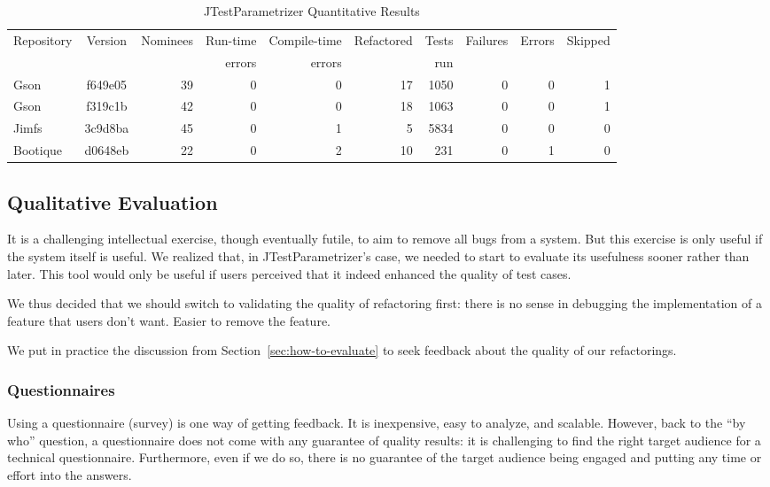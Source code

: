 \begin{table*}[h!]
\centering
\begin{tabular}{l c r r r r r r r r} 
 Repository & Version & Nominees & Run-time  & Compile-time  & Refactored & Tests & Failures & Errors & Skipped \\
  &  &  & errors & errors &  & run &  &  &  \\ [0.75ex]
 \hline\hline
 Gson & f649e05 & 39 & 0 & 0 & 17 & 1050 & 0 & 0 & 1 \\ 
 Gson & f319c1b & 42 & 0 & 0 & 18 & 1063 & 0 & 0 & 1 \\ 
 Jimfs & 3c9d8ba & 45 & 0 & 1 & 5 & 5834 & 0 & 0 & 0 \\ 
 Bootique & d0648eb & 22 & 0 & 2 & 10 & 231 & 0 & 1 & 0 \\ 
\end{tabular}
\caption{JTestParametrizer Quantitative Results}
\label{table:quantitative_results}
\end{table*}

\subsection{Qualitative Evaluation}
It is a challenging intellectual exercise, though eventually futile,
to aim to remove all bugs from a system. But this exercise is only useful
if the system itself is useful. We realized that, in JTestParametrizer's
case, we needed to start to evaluate its usefulness sooner rather than later.
This tool would only be useful if users perceived that it indeed enhanced the
quality of test cases.

We thus decided that we should switch to validating the quality of
refactoring first: there is no sense in debugging the implementation of a feature
that users don't want. Easier to remove the feature.

We put in practice the discussion  from Section~\ref{sec:how-to-evaluate}
to seek feedback about the quality of our refactorings.

\subsubsection{Questionnaires}
Using a questionnaire (survey) is one way of getting feedback. It is
inexpensive, easy to analyze, and scalable. However, back to the
``by who'' question, a questionnaire does not come with any
guarantee of quality results: it is challenging to find the right
target audience for a technical questionnaire. Furthermore, even if we
do so, there is no guarantee of the target audience being
engaged and putting any time or effort into the answers.

